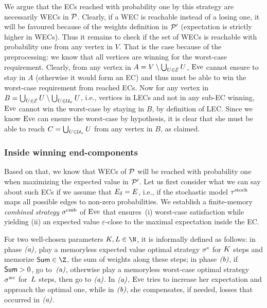 We argue that the ECs reached with probability one by this strategy are necessarily WECs in ${\mathcal{P}} $. Clearly, if a WEC is reachable instead of a losing one, it will be favoured because of the weights definition in ${\mathcal{P}} '$ (expectation is strictly higher in WECs). Thus it remains to check if the set of WECs is reachable with probability one from any vertex in $V$. That is the case because of the preprocessing: we know that all vertices are winning for the worst-case requirement. Clearly, from any vertex in $A = V \setminus \bigcup_{U \in \mathcal{E}} U$, $\text{Eve}$ cannot ensure to stay in $A$ (otherwise it would form an EC) and thus must be able to win the worst-case requirement from reached ECs. Now for any vertex in $B = \bigcup_{U \in \mathcal{E}} U \setminus \bigcup_{U \in \mathcal{U}_{\textsc{w}}} U$, i.e., vertices in LECs and not in any sub-EC winning, $\text{Eve}$ cannot win the worst-case by staying in $B$, by definition of LEC. Since we know $\text{Eve}$ can ensure the worst-case by hypothesis, it is clear that she must be able to reach $C = \bigcup_{U \in \mathcal{U}_{\textsc{w}}} U$ from any vertex in $B$, as claimed.

\subsubsection*{Inside winning end-components} Based on that, we know that WECs of ${\mathcal{P}} $ will be reached with probability one when maximizing the expected value in ${\mathcal{P}} '$. Let us first consider what we can say about such ECs if we assume that $E_{\delta} = E$, i.e., if the stochastic model $\tau^{\text{stoch}} $ maps all possible edges to non-zero probabilities. 
We establish a finite-memory \textit{combined strategy} $\sigma^{\text{cmb}}$ of $\text{Eve}$ that ensures~(i) worst-case satisfaction while yielding (ii) an expected value $\varepsilon$-close to the maximal expectation inside the EC.

For two well-chosen parameters $\stepsExp, \stepsWC \in \N$, it is informally defined as follows: in phase $\textit{(a)}$, play a memoryless expected value optimal strategy $\sigma^{\text{e}}$ for $K$ steps and memorize $\cmbSum \in \Z$, the sum of weights along these steps; in phase $\textit{(b)}$, if $\mathsf{Sum} > 0$, go to~$\textit{(a)}$, otherwise play a memoryless worst-case optimal strategy $\sigma^{\text{wc}}$ for~$L$ steps, then go to $\textit{(a)}$. In $\textit{(a)}$, $\text{Eve}$ tries to increase her expectation and approach the optimal one, while in $\textit{(b)}$, she compensates, if needed, losses that occurred in $\textit{(a)}$.

